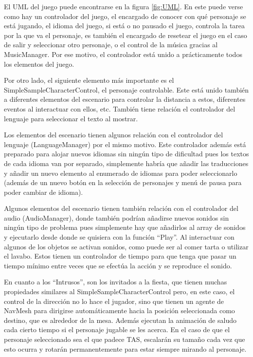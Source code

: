 \documentclass[12pt, a4paper,twoside,titlepage]{book}
\begin{document}
El UML del juego puede encontrarse en la figura \ref{fig:UML}. En este puede verse como hay un controlador del juego, el encargado de conocer con qué personaje se está jugando, el idioma del juego, si está o no pausado el juego, controla la tarea por la que va el personaje, es también el encargado de resetear el juego en el caso de salir y seleccionar otro personaje, o el control de la música gracias al MusicManager. Por ese motivo, el controlador está unido a prácticamente todos los elementos del juego. 

Por otro lado, el siguiente elemento más importante es el SimpleSampleCharacterControl, el personaje controlable. Este está unido también a diferentes elementos del escenario para controlar la distancia a estos, diferentes eventos al interactuar con ellos, etc. También tiene relación el controlador del lenguaje para seleccionar el texto al mostrar. 

Los elementos del escenario tienen algunos relación con el controlador del lenguaje (LanguageManager) por el mismo motivo. Este controlador además está preparado para alojar nuevos idiomas sin ningún tipo de dificultad pues los textos de cada idioma van por separado, simplemente habría que añadir las traducciones y añadir un nuevo elemento al enumerado de idiomas para poder seleccionarlo (además de un nuevo botón en la selección de personajes y menú de pausa para poder cambiar de idioma). 

Algunos elementos del escenario tienen también relación con el controlador del audio (AudioManager), donde también podrían añadirse nuevos sonidos sin ningún tipo de problema pues simplemente hay que añadirlos al array de sonidos y ejecutarlo desde donde se quisiera con la función ``Play''. Al interactuar con algunos de los objetos se activan sonidos, como puede ser al comer tarta o utilizar el lavabo. Estos tienen un controlador de tiempo para que tenga que pasar un tiempo mínimo entre veces que se efectúa la acción y se reproduce el sonido. 

En cuanto a los ``Intrusos'', son los invitados a la fiesta, que tienen muchas propiedades similares al SimpleSampleCharacterControl pero, en este caso, el control de la dirección no lo hace el jugador, sino que tienen un agente de NavMesh para dirigirse automáticamente hacia la posición seleccionada como destino, que es alrededor de la mesa. Además ejecutan la animación de saludo cada cierto tiempo si el personaje jugable se les acerca. En el caso de que el personaje seleccionado sea el que padece TAS, escalarán su tamaño cada vez que esto ocurra y rotarán permanentemente para estar siempre mirando al personaje.  
\end{document}
